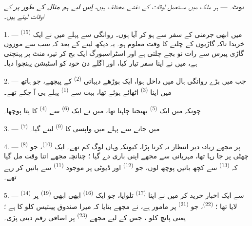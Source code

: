 \VUsaut{4.0mm}
\VUsaut{2.4mm}
\VUsaut{3.4mm}
\textsc{نوٹ۔} --- \textit{ہر ملک میں مستعمل اوقات کے نقشے مختلف ہیں،}
\textit{اِس لیے ہم مثال کے طور پر}  \textit{کے
اوقات لیتے ہیں۔}

1. --- میں ابھی جرمنی کے سفر سے ہو کر آیا ہوں۔ روانگی سے پہلے میں نے
ایک  \textsuperscript{(15)} خریدا تاکہ گاڑیوں کے
چلنے کا وقت معلوم ہو۔ یہ دیکھ لینے کے بعد کہ سب سے موزوں گاڑی پیرس سے
رات نو بجے چلتی ہے اور اسٹراسبورگ ایک بج کر تیرہ منٹ پر پہنچتی ہے،
میں نے اپنا سفر تیار کیا، اور اگلے دن خود کو اسٹیشن پہنچوا دیا۔

2. --- جب میں بڑے روانگی ہال میں داخل ہوا، ایک بوڑھے دیہاتی
 \textsuperscript{(2)} کے پیچھے، جو ہاتھ میں اپنا
 \textsuperscript{(3)} اٹھائے ہوئے تھا، بہت سے
 \textsuperscript{(1)} پہلے ہی آ چکے تھے۔

چونکہ میں ایک  \textsuperscript{(5)} بھیجنا چاہتا تھا،
میں نے ایک  \textsuperscript{(6)} سے
 \textsuperscript{(4)} کا پتا پوچھا۔

3. ---  \textsuperscript{(7)} میں جانے سے پہلے میں
واپسی کا  \textsuperscript{(9)} لینے گیا۔

4. ---  \textsuperscript{(8)} پر مجھے زیادہ دیر انتظار
نہ کرنا پڑا، کیونکہ وہاں لوگ کم تھے۔ ایک 
\textsuperscript{(10)}، جو چھٹی پر جا رہا تھا، مہربانی سے مجھے اپنی
باری دے گیا ؛ چنانچہ مجھے اتنا وقت مل گیا کہ 
\textsuperscript{(13)} سے کچھ باتیں پوچھ لوں، جو  \textsuperscript{(12)} اور ڈیوٹی پر موجود  \textsuperscript{(11)} سے باتیں کر رہے تھے۔

\VUsaut{3.0mm}

5. ---  \textsuperscript{(14)} سے ایک اخبار
خرید کر میں نے اپنا  \textsuperscript{(17)} تلوایا، جو
ایک  \textsuperscript{(16)} ابھی ابھی  \textsuperscript{(19)} پر لایا تھا ؛ 
\textsuperscript{(22)}، جو  \textsuperscript{(21)}
پر مامور ہے، نے مجھے بتایا کہ میرا صندوق پینتیس کلو کا ہے ؛ یعنی پانچ
کلو ، جس کے لیے مجھے 
\textsuperscript{(23)} پر اضافی رقم دینی پڑی۔

